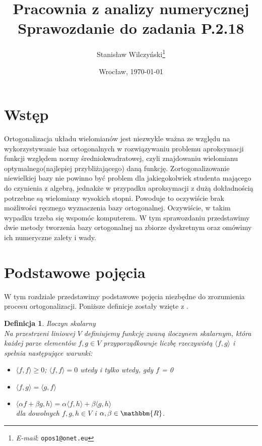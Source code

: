 \documentclass[12pt,wide]{mwart}
\date{Wrocław, \today}
\title{\LARGE\textbf{Pracownia z analizy numerycznej}\\ Sprawozdanie do zadania \textbf{P.2.18}}
\author{Stanisław Wilczyński\thanks{\textit{E-mail}: \texttt{opos1@onet.eu}}}
\newtheorem{defin}{Definicja}
\begin{document}
\maketitle                %
\thispagestyle{empty}     %
\tableofcontents          %

\section{Wstęp}

Ortogonalizacja układu wielomianów jest niezwykle ważna ze względu na wykorzystywanie baz ortogonalnych w rozwiązywaniu problemu aproksymacji funkcji względem normy średniokwadratowej, czyli znajdowaniu wielomianu optymalnego(najlepiej przybliżającego) daną funkcję. Zortogonalizowanie niewielkiej bazy nie powinno być problem dla jakiegokolwiek studenta mającego do czynienia z algebrą, jednakże w przypadku aproksymacji z dużą dokładnością potrzebne są wielomiany wysokich stopni. Powoduje to oczywiście brak możliwości ręcznego wyznaczenia bazy ortogonalnej. Oczywiście, w takim wypadku trzeba się wspomóc komputerem. W tym sprawozdaniu przedstawimy dwie metody tworzenia bazy ortogonalnej na zbiorze dyskretnym oraz omówimy ich numeryczne zalety i wady.

\section{Podstawowe pojęcia}
W tym rozdziale przedstawimy podstawowe pojęcia niezbędne do zrozumienia procesu ortogonalizacji. Poniższe definicje zostały wzięte z \cite{JMJ}.

\begin{defin}{Iloczyn skalarny}\\
Na przestrzeni liniowej $V$ definiujemy funkcję zwaną iloczynem skalarnym, która każdej parze elementów $f,g \in V$ przyporządkowuje liczbę rzeczywistą $\langle f,g \rangle$ i spełnia następujące warunki:
\begin{itemize}
	\item $\langle f,f \rangle \geq 0$; $\langle f,f \rangle = 0$ wtedy i tylko wtedy, gdy $f$ = 0
	\item $\langle f,g \rangle = \langle g,f \rangle$
	\item $\langle \alpha f + \beta g ,h \rangle = \alpha\langle f,h \rangle + \beta\langle g,h \rangle$\\
	dla dowolnych $f,g,h \in V$ i $\alpha,\beta \in \mathbbm{R}$.
\end{itemize} 
\end{defin}
\end{document}
